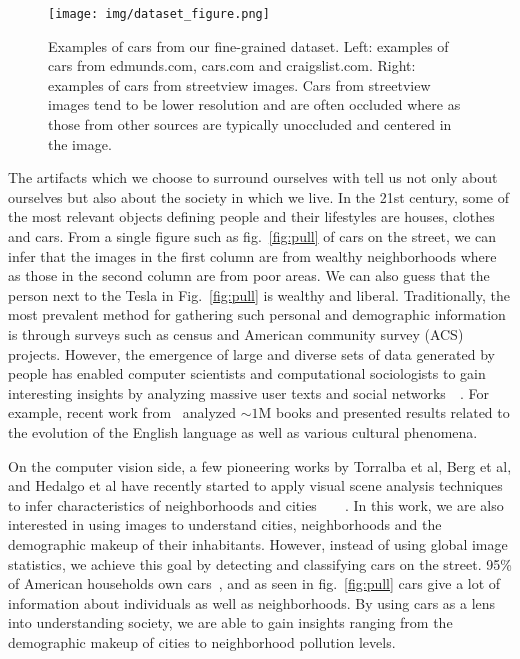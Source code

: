 \documentclass[10pt,twocolumn,letterpaper]{article}
\begin{document}
\begin{figure}[t]
\begin{center}
   \texttt{[image: img/dataset\_figure.png]}
\end{center}
   \caption{Examples of cars from our fine-grained dataset. Left: examples of cars from edmunds.com, cars.com and craigslist.com. Right: examples of cars from streetview images. Cars from streetview images tend to be lower resolution and are often occluded where as those from other sources are typically unoccluded and centered in the image.}
\label{fig:dataset1}
\end{figure}
The artifacts which we choose to surround ourselves with tell us not only about ourselves but also about the society in which we live. In the 21st century, some of the most relevant objects defining people and their lifestyles are houses, clothes and cars. From a single figure such as fig.~\ref{fig:pull} of cars on the street, we can infer that the images in the first column are from wealthy neighborhoods where as those in the second column are from poor areas. We can also guess that the person next to the Tesla in Fig.~\ref{fig:pull} is wealthy and liberal. Traditionally, the most prevalent method for gathering such personal and demographic information is through surveys such as census and American community survey (ACS) projects. However, the emergence of large and diverse sets of data generated by people has enabled computer scientists and computational sociologists to gain interesting insights by analyzing massive user texts and social networks~\cite{jure}~\cite{nlp_people}. For example, recent work from~\cite{ngrams} analyzed \(\sim 1\)M books and presented results related to the evolution of the English language as well as various cultural phenomena.

On the computer vision side, a few pioneering works by Torralba et al, Berg et al, and Hedalgo et al have recently started to apply visual scene analysis techniques to infer characteristics of neighborhoods and cities~\cite{antonio}~\cite{mcdonalds}~\cite{mit_cvpr}~\cite{tamara}. In this work, we are also interested in using images to understand cities, neighborhoods and the demographic makeup of their inhabitants. However, instead of using global image statistics, we achieve this goal by detecting and classifying cars on the street. 95\% of American households own cars~\cite{car_stats}, and as seen in fig.~\ref{fig:pull} cars give a lot of information about individuals as well as neighborhoods. By using cars as a lens into understanding society, we are able to gain insights ranging from the demographic makeup of cities to neighborhood pollution levels.
\end{document}
